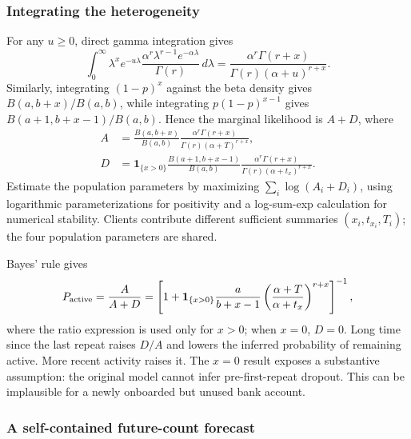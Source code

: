 \subsubsection{Integrating the heterogeneity}

For any $u\ge0$, direct gamma integration gives
\[
 \int_0^\infty\lambda^xe^{-u\lambda}
 \frac{\alpha^r\lambda^{r-1}e^{-\alpha\lambda}}{\Gamma(r)}\,d\lambda
 =\frac{\alpha^r\Gamma(r+x)}{\Gamma(r)(\alpha+u)^{r+x}}.
\]
Similarly, integrating $(1-p)^x$ against the beta density gives $B(a,b+x)/B(a,b)$, while integrating $p(1-p)^{x-1}$ gives $B(a+1,b+x-1)/B(a,b)$. Hence the marginal likelihood is $A+D$, where
\begin{align}
 A&=\frac{B(a,b+x)}{B(a,b)}
       \frac{\alpha^r\Gamma(r+x)}{\Gamma(r)(\alpha+T)^{r+x}},\label{eq:bgnbd-A}\\
 D&=\mathbf 1_{\{x>0\}}\frac{B(a+1,b+x-1)}{B(a,b)}
       \frac{\alpha^r\Gamma(r+x)}{\Gamma(r)(\alpha+t_x)^{r+x}}.\label{eq:bgnbd-D}
\end{align}
Estimate the population parameters by maximizing $\sum_i\log(A_i+D_i)$, using logarithmic parameterizations for positivity and a log-sum-exp calculation for numerical stability. Clients contribute different sufficient summaries $(x_i,t_{x_i},T_i)$; the four population parameters are shared.

Bayes' rule gives
\begin{equation}
 P_{\rm active}=\frac{A}{A+D}
 =\left[1+\mathbf1_{\{x>0\}}\frac{a}{b+x-1}
       \left(\frac{\alpha+T}{\alpha+t_x}\right)^{r+x}\right]^{-1},
 \label{eq:bgnbd-alive}
\end{equation}
where the ratio expression is used only for $x>0$; when $x=0$, $D=0$. Long time since the last repeat raises $D/A$ and lowers the inferred probability of remaining active. More recent activity raises it. The $x=0$ result exposes a substantive assumption: the original model cannot infer pre-first-repeat dropout. This can be implausible for a newly onboarded but unused bank account.

\subsubsection{A self-contained future-count forecast}

